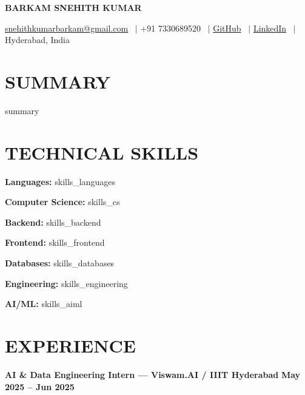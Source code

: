 \documentclass[10pt,a4paper]{article}
\begin{document}

\begin{center}

{\Huge\textbf{BARKAM SNEHITH KUMAR}}

\vspace{2pt}

\small
\href{mailto:snehithkumarbarkam@gmail.com}
{snehithkumarbarkam@gmail.com}
\ $|$ +91 7330689520
\ $|$
\href{https://github.com/snehithkumar18}{GitHub}
\ $|$
\href{https://www.linkedin.com/in/snehith-kumar-4266071b8/}{LinkedIn}
\ $|$ Hyderabad, India

\end{center}

\vspace{-5pt}


\section*{SUMMARY}

{{ summary }}


\section*{TECHNICAL SKILLS}

\textbf{Languages:} {{ skills_languages }}

\textbf{Computer Science:} {{ skills_cs }}

\textbf{Backend:} {{ skills_backend }}

\textbf{Frontend:} {{ skills_frontend }}

\textbf{Databases:} {{ skills_databases }}

\textbf{Engineering:} {{ skills_engineering }}

\textbf{AI/ML:} {{ skills_aiml }}


\section*{EXPERIENCE}

\textbf{AI \& Data Engineering Intern --- Viswam.AI / IIIT Hyderabad}
\hfill \textbf{May 2025 -- Jun 2025}

\end{document}
